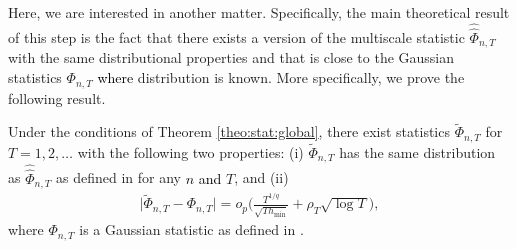 \documentclass[a4paper,12pt]{article}
\makeatletter
\renewcommand{\eqref}[1]{\tagform@{\ref{#1}}}
\newcommand{\doublehattwo}[1]{\widehat{\widehat{#1}}}
\makeatother
\begin{document}
Here, we are interested in another matter. Specifically, the main theoretical result of this step is the fact that there exists a version of the multiscale statistic $\doublehattwo{\Phi}_{n,T}$ with the same distributional properties and that is close to the Gaussian statistics $\Phi_{n,T}$ \textcolor{black}{where} distribution is known. More specifically, we prove the following result. 

\begin{propA}\label{propA:strong_approx}
Under the conditions of Theorem \ref{theo:stat:global}, there exist statistics $\widetilde{\Phi}_{n,T}$ for $T = 1,2,\ldots$ with the following two properties: (i) $\widetilde{\Phi}_{n, T}$ has the same distribution as $\doublehattwo{\Phi}_{n, T}$ as defined in \eqref{eqA:Phi_doublehat} for any \textcolor{black}{$n$ and } $T$, and (ii)
\begin{align}\label{eq-strong-approx-equality}
\big| \widetilde{\Phi}_{n, T} - \Phi_{n,T} \big| = o_p \Big( \frac{T^{1/q}}{\sqrt{T h_{\min}}} + \rho_T\sqrt{\log T} \Big),
\end{align}
where $\Phi_{n,T}$ is a Gaussian statistic as defined in \eqref{eq:Phi}. 
\end{propA}
\end{document}
